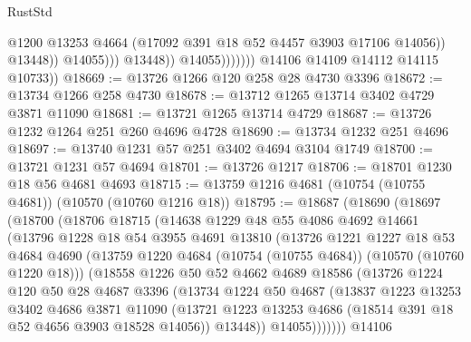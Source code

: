 \begin{lexlean}{RustStd}
\begin{coremodule}
                                      @1200
                                      @13253
                                      @4664
                                      (@17092 @391 @18 @52 @4457 @3903 @17106 @14056))
                                    @13448))
                                @14055)))
                          @13448))
                      @14055)))))))
        @14106
        @14109
        @14112
        @14115
        @10733))
@18669 := @13726 @1266 @120 @258 @28 @4730 @3396
@18672 := @13734 @1266 @258 @4730
@18678 := @13712 @1265 @13714 @3402 @4729 @3871 @11090
@18681 := @13721 @1265 @13714 @4729
@18687 := @13726 @1232 @1264 @251 @260 @4696 @4728
@18690 := @13734 @1232 @251 @4696
@18697 := @13740 @1231 @57 @251 @3402 @4694 @3104 @1749
@18700 := @13721 @1231 @57 @4694
@18701 := @13726 @1217
@18706 := @18701 @1230 @18 @56 @4681 @4693
@18715 := @13759 @1216 @4681 (@10754 (@10755 @4681)) (@10570 (@10760 @1216 @18))
@18795 := @18687
    (@18690
      (@18697
        (@18700
          (@18706
            @18715
            (@14638
              @1229
              @48
              @55
              @4086
              @4692
              @14661
              (@13796
                @1228
                @18
                @54
                @3955
                @4691
                @13810
                (@13726
                  @1221
                  @1227
                  @18
                  @53
                  @4684
                  @4690
                  (@13759 @1220 @4684 (@10754 (@10755 @4684)) (@10570 (@10760 @1220 @18)))
                  (@18558
                    @1226
                    @50
                    @52
                    @4662
                    @4689
                    @18586
                    (@13726
                      @1224
                      @120
                      @50
                      @28
                      @4687
                      @3396
                      (@13734
                        @1224
                        @50
                        @4687
                        (@13837
                          @1223
                          @13253
                          @3402
                          @4686
                          @3871
                          @11090
                          (@13721
                            @1223
                            @13253
                            @4686
                            (@18514 @391 @18 @52 @4656 @3903 @18528 @14056))
                          @13448))
                      @14055)))))))
        @14106

\end{coremodule}
\end{lexlean}
